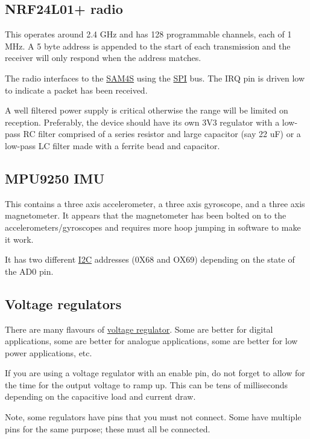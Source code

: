 \subsection{NRF24L01+ radio}\label{nrf24l01-radio}

This operates around 2.4 GHz and has 128 programmable channels, each of
1 MHz. A 5 byte address is appended to the start of each transmission
and the receiver will only respond when the address matches.

The radio interfaces to the \url{SAM4S} using the \url{SPI} bus. The IRQ
pin is driven low to indicate a packet has been received.

A well filtered power supply is critical otherwise the range will be
limited on reception. Preferably, the device should have its own 3V3
regulator with a low-pass RC filter comprised of a series resistor and
large capacitor (say 22 uF) or a low-pass LC filter made with a ferrite
bead and capacitor.

\subsection{MPU9250 IMU}\label{mpu9250-imu}

This contains a three axis accelerometer, a three axis gyroscope, and a
three axis magnetometer. It appears that the magnetometer has been
bolted on to the accelerometers/gyroscopes and requires more hoop
jumping in software to make it work.

It has two different \url{I2C} addresses (0X68 and OX69) depending on
the state of the AD0 pin.


\subsection{Voltage regulators}\label{voltage-regulators}

There are many flavours of \href{voltage_regulators}{voltage regulator}.
Some are better for digital applications, some are better for analogue
applications, some are better for low power applications, etc.

If you are using a voltage regulator with an enable pin, do not forget
to allow for the time for the output voltage to ramp up. This can be
tens of milliseconds depending on the capacitive load and current draw.

Note, some regulators have pins that you must not connect. Some have
multiple pins for the same purpose; these must all be connected.

